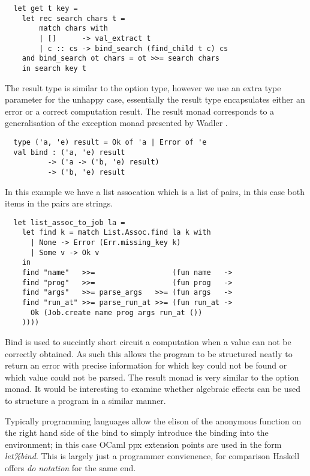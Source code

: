 \documentclass[a4paper,10pt]{article}
\theoremstyle{definition}
\begin{document}
\begin{verbatim}
  let get t key =
    let rec search chars t =
        match chars with
        | []      -> val_extract t
        | c :: cs -> bind_search (find_child t c) cs
    and bind_search ot chars = ot >>= search chars
    in search key t
\end{verbatim}

The result type is similar to the option type, however we use an extra type
parameter for the unhappy case, essentially the result type encapsulates 
either an error or a correct computation result. The result monad
corresponds to a generalisation of the exception monad presented by Wadler \cite{wadler1995monads}.

\begin{verbatim}
  type ('a, 'e) result = Ok of 'a | Error of 'e
  val bind : ('a, 'e) result
          -> ('a -> ('b, 'e) result)
          -> ('b, 'e) result
\end{verbatim}

In this example we have a list assocation which is a list of pairs, in this case both
items in the pairs are strings.

\begin{verbatim}
  let list_assoc_to_job la =
    let find k = match List.Assoc.find la k with
      | None -> Error (Err.missing_key k)
      | Some v -> Ok v
    in
    find "name"   >>=                  (fun name   ->
    find "prog"   >>=                  (fun prog   ->
    find "args"   >>= parse_args   >>= (fun args   ->
    find "run_at" >>= parse_run_at >>= (fun run_at ->
      Ok (Job.create name prog args run_at ())
    ))))
\end{verbatim}

Bind is used to succintly short circuit a computation when a value can not be
correctly obtained. As such this allows the program to be structured neatly to return
an error with precise information for which key could not be found or which value could
not be parsed. The result monad is very similar to the option monad. It would be interesting
to examine whether algebraic effects can be used to structure a program in a similar manner.

Typically programming languages allow the elison of the anonymous function on the right hand side
of the bind to simply introduce the binding into the environment;
in this case OCaml ppx extension points are used in the form \textit{let\%bind}.
This is largely just a programmer convienence,
for comparison Haskell offers \textit{do notation} for the same end.
\end{document}
